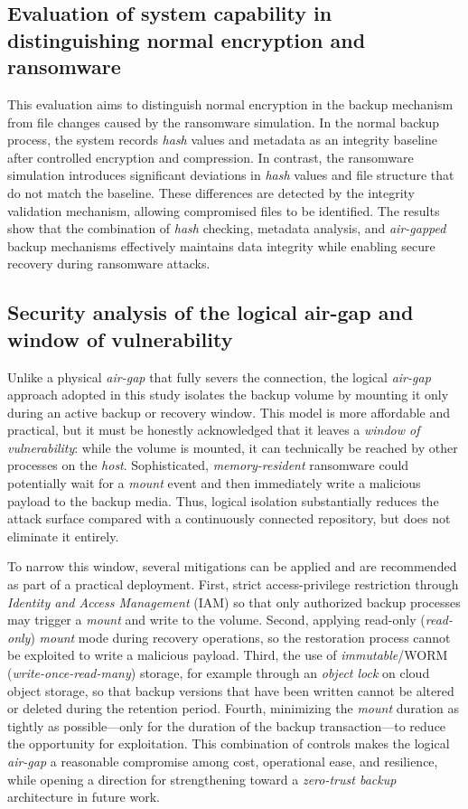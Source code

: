 \documentclass{iaesarticle}
\begin{document}
\subsection{Evaluation of system capability in distinguishing normal encryption and ransomware}
This evaluation aims to distinguish normal encryption in the backup mechanism from file changes caused by the ransomware simulation. In the normal backup process, the system records \textit{hash} values and metadata as an integrity baseline after controlled encryption and compression. In contrast, the ransomware simulation introduces significant deviations in \textit{hash} values and file structure that do not match the baseline. These differences are detected by the integrity validation mechanism, allowing compromised files to be identified. The results show that the combination of \textit{hash} checking, metadata analysis, and \textit{air-gapped} backup mechanisms effectively maintains data integrity while enabling secure recovery during ransomware attacks.

\subsection{Security analysis of the logical air-gap and window of vulnerability}
Unlike a physical \textit{air-gap} that fully severs the connection, the logical \textit{air-gap} approach adopted in this study isolates the backup volume by mounting it only during an active backup or recovery window. This model is more affordable and practical, but it must be honestly acknowledged that it leaves a \textit{window of vulnerability}: while the volume is mounted, it can technically be reached by other processes on the \textit{host}. Sophisticated, \textit{memory-resident} ransomware could potentially wait for a \textit{mount} event and then immediately write a malicious payload to the backup media. Thus, logical isolation substantially reduces the attack surface compared with a continuously connected repository, but does not eliminate it entirely.

To narrow this window, several mitigations can be applied and are recommended as part of a practical deployment. First, strict access-privilege restriction through \textit{Identity and Access Management} (IAM) so that only authorized backup processes may trigger a \textit{mount} and write to the volume. Second, applying read-only (\textit{read-only}) \textit{mount} mode during recovery operations, so the restoration process cannot be exploited to write a malicious payload. Third, the use of \textit{immutable}/WORM (\textit{write-once-read-many}) storage, for example through an \textit{object lock} on cloud object storage, so that backup versions that have been written cannot be altered or deleted during the retention period. Fourth, minimizing the \textit{mount} duration as tightly as possible---only for the duration of the backup transaction---to reduce the opportunity for exploitation. This combination of controls makes the logical \textit{air-gap} a reasonable compromise among cost, operational ease, and resilience, while opening a direction for strengthening toward a \textit{zero-trust backup} architecture in future work.
\end{document}
